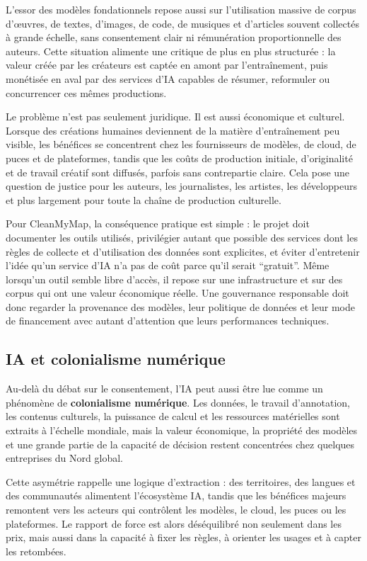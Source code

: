 \documentclass[
  10pt,
  a4paper,
  DIV=11,
  numbers=noendperiod,
  oneside]{scrreprt}
\let\oldtextbf\textbf
\renewcommand{\textbf}[1]{\oldtextbf{\textcolor{cmmnavy}{#1}}}
\begin{document}
L'essor des modèles fondationnels repose aussi sur l'utilisation massive
de corpus d'œuvres, de textes, d'images, de code, de musiques et
d'articles souvent collectés à grande échelle, sans consentement clair
ni rémunération proportionnelle des auteurs. Cette situation alimente
une critique de plus en plus structurée : la valeur créée par les
créateurs est captée en amont par l'entraînement, puis monétisée en aval
par des services d'IA capables de résumer, reformuler ou concurrencer
ces mêmes productions.

Le problème n'est pas seulement juridique. Il est aussi économique et
culturel. Lorsque des créations humaines deviennent de la matière
d'entraînement peu visible, les bénéfices se concentrent chez les
fournisseurs de modèles, de cloud, de puces et de plateformes, tandis
que les coûts de production initiale, d'originalité et de travail
créatif sont diffusés, parfois sans contrepartie claire. Cela pose une
question de justice pour les auteurs, les journalistes, les artistes,
les développeurs et plus largement pour toute la chaîne de production
culturelle.

Pour CleanMyMap, la conséquence pratique est simple : le projet doit
documenter les outils utilisés, privilégier autant que possible des
services dont les règles de collecte et d'utilisation des données sont
explicites, et éviter d'entretenir l'idée qu'un service d'IA n'a pas de
coût parce qu'il serait ``gratuit''. Même lorsqu'un outil semble libre
d'accès, il repose sur une infrastructure et sur des corpus qui ont une
valeur économique réelle. Une gouvernance responsable doit donc regarder
la provenance des modèles, leur politique de données et leur mode de
financement avec autant d'attention que leurs performances techniques.

\subsection{IA et colonialisme
numérique}\label{ia-et-colonialisme-numuxe9rique}

Au-delà du débat sur le consentement, l'IA peut aussi être lue comme un
phénomène de \textbf{colonialisme numérique}. Les données, le travail
d'annotation, les contenus culturels, la puissance de calcul et les
ressources matérielles sont extraits à l'échelle mondiale, mais la
valeur économique, la propriété des modèles et une grande partie de la
capacité de décision restent concentrées chez quelques entreprises du
Nord global.

Cette asymétrie rappelle une logique d'extraction : des territoires, des
langues et des communautés alimentent l'écosystème IA, tandis que les
bénéfices majeurs remontent vers les acteurs qui contrôlent les modèles,
le cloud, les puces ou les plateformes. Le rapport de force est alors
déséquilibré non seulement dans les prix, mais aussi dans la capacité à
fixer les règles, à orienter les usages et à capter les retombées.
\end{document}

